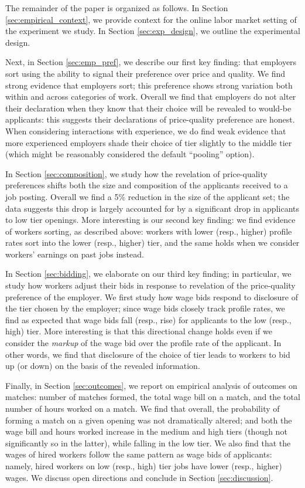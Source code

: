 \documentclass[prodmode,acmec]{ec-acmsmall}
\begin{document}
The remainder of the paper is organized as follows.
In Section \ref{sec:empirical_context}, we provide context for the online labor market setting of the experiment we study.
In Section \ref{sec:exp_design}, we outline the experimental design.

Next, in Section \ref{sec:emp_pref}, we describe our first key finding: that employers sort using the ability to signal their preference over price and quality. 
We find strong evidence that employers sort; this preference shows strong variation both within and across categories of work.
Overall we find that employers do not alter their declaration when they know that their choice will be revealed to would-be applicants: 
this suggests their declarations of price-quality preference are honest.
When considering interactions with experience, we do find weak evidence that more experienced employers shade their choice of tier slightly to the middle tier (which might be reasonably considered the default ``pooling'' option).

In Section \ref{sec:composition}, we study how the revelation of price-quality preferences shifts both the size and composition of the applicants received to a job posting.  
Overall we find a 5\% reduction in the size of the applicant set; the data suggests this drop is largely accounted for by a significant drop in applicants to low tier openings.  
More interesting is our second key finding: we find evidence of workers sorting, as described above: workers with lower (resp., higher) profile rates sort into the lower (resp., higher) tier, and the same holds when we consider workers' earnings on past jobs instead.

In Section \ref{sec:bidding}, we elaborate on our third key finding; in particular, we study how workers adjust their bids in response to revelation of the price-quality preference of the employer.  
We first study how wage bids respond to disclosure of the tier chosen by the employer; since wage bids closely track profile rates, we find as expected that wage bids fall (resp., rise) for applicants to the low (resp., high) tier.
More interesting is that this directional change holds even if we consider the {\em markup} of the wage bid over the profile rate of the applicant.   
In other words, we find that disclosure of the choice of tier leads to workers to bid up (or down) on the basis of the revealed information.

Finally, in Section \ref{sec:outcomes}, we report on empirical analysis of outcomes on matches: number of matches formed, the total wage bill on a match, and the total number of hours worked on a match.
We find that overall, the probability of forming a match on a given opening was not dramatically altered; and both the wage bill and hours worked increase in the medium and high tiers (though not significantly so in the latter), while falling in the low tier.  
We also find that the wages of hired workers follow the same pattern as wage bids of applicants: namely, hired workers on low (resp., high) tier jobs have lower (resp., higher) wages.  We discuss open directions and conclude in Section \ref{sec:discussion}.  
\end{document}
